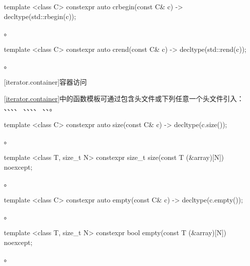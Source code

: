 %
\begin{itemdecl}
template <class C> constexpr auto crbegin(const C& c) -> decltype(std::rbegin(c));
\end{itemdecl}
\begin{itemdescr}
\pnum \returns {}。
\end{itemdescr}

%
\begin{itemdecl}
template <class C> constexpr auto crend(const C& c) -> decltype(std::rend(c));
\end{itemdecl}
\begin{itemdescr}
\pnum \returns {}。
\end{itemdescr}

[iterator.container]{容器访问}

\pnum
\ref{iterator.container}中的函数模板可通过包含头文件或下列任意一个头文件引入：
、、、、
、、、、
、、。

\begin{itemdecl}
template <class C> constexpr auto size(const C& c) -> decltype(c.size());
\end{itemdecl}
\begin{itemdescr}
\pnum \returns {}。
\end{itemdescr}

\begin{itemdecl}
template <class T, size_t N> constexpr size_t size(const T (&array)[N]) noexcept;
\end{itemdecl}
\begin{itemdescr}
\pnum \returns {}。
\end{itemdescr}

\begin{itemdecl}
template <class C> constexpr auto empty(const C& c) -> decltype(c.empty());
\end{itemdecl}
\begin{itemdescr}
\pnum \returns {}。
\end{itemdescr}

\begin{itemdecl}
template <class T, size_t N> constexpr bool empty(const T (&array)[N]) noexcept;
\end{itemdecl}
\begin{itemdescr}
\pnum \returns {}。
\end{itemdescr}

